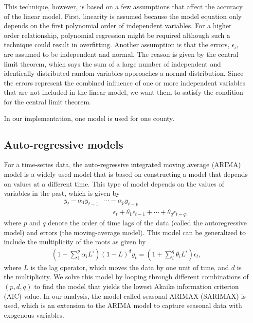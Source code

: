 \documentclass[prl,aps,superscriptaddress,twocolumn,10pt,nolongbibliography]{revtex4-2}
\begin{document}
This technique, however, is based on a few assumptions that affect the accuracy of the linear model. 
First, linearity is assumed because the model equation only depends on the first polynomial order of independent variables. 
For a higher order relationship, polynomial regression might be required although such a technique could result in overfitting. 
Another assumption is that the errors, $\epsilon_i$, are assumed to be independent and normal. 
The reason is given by the central limit theorem, which says the sum of a large number of independent and identically distributed random variables approaches a normal distribution. 
Since the errors represent the combined influence of one or more independent variables that are not included in the linear model, we want them to satisfy the condition for the central limit theorem. 

In our implementation, one model is used for one county. 

\subsection{Auto-regressive models}
For a time-series data, the auto-regressive integrated moving average (ARIMA) model is a widely used model that is based on constructing a model that depends on values at a different time. 
This type of model depends on the values of variables in the past, which is given by 
\begin{align}
y_t - \alpha_1 y_{t-1} &\cdots - \alpha_p y_{t-p} \nonumber \\
&= \epsilon_t + \theta_1 \epsilon_{t-1} + \cdots + \theta_q \epsilon_{t-q},
\end{align}
where $p$ and $q$ denote the order of time lags of the data (called the autoregressive model) and errors (the moving-average model). 
This model can be generalized to include the multiplicity of the roots as given by 
\begin{align}
(1 - \sum_i^p \alpha_i L^i) (1 - L)^d y_t = (1 + \sum_i^q \theta_i L^i) \epsilon_t,
\end{align}
where $L$ is the lag operator, which moves the data by one unit of time, and $d$ is the multiplicity. 
We solve this model by looping through different combinations of $(p, d, q)$ to find the model that yields the lowest Akaike information criterion (AIC) value. 
In our analysis, the model called seasonal-ARIMAX (SARIMAX) is used, which is an extension to the ARIMA model to capture seasonal data with exogenous variables.
\end{document}
